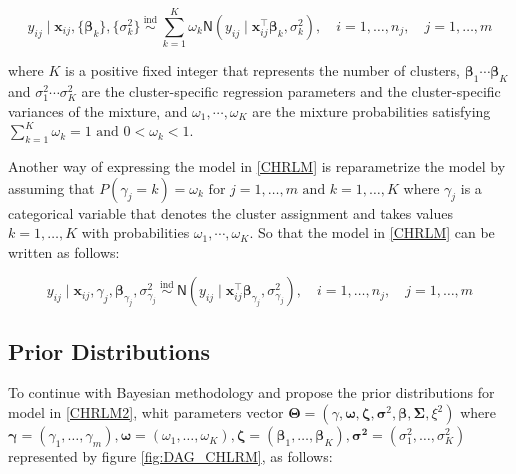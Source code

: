 \begin{equation}
\label{CHRLM}
y_{ij} \mid \bm{x}_{ij}, \lbrace\bm{\beta}_k\rbrace, \lbrace\sigma_k^2 \rbrace \stackrel{\text { ind }}{\sim} \sum_{k=1}^{K}\omega_k\mathsf{N}\left(y_{ij}\mid\bm{x}_{ij}^{\bm{\top}} \bm{\beta}_k, \sigma_k^2\right), \quad i=1, \ldots, n_j, \quad j=1, \ldots, m
\end{equation}

where $K$ is a positive fixed integer that represents the number of clusters, $\bm{\beta}_1\cdots\bm{\beta}_K$ and $\sigma^2_1\cdots\sigma^2_K$ are the cluster-specific regression parameters and the cluster-specific variances of the mixture, and $\omega_1,\cdots,\omega_K$ are the mixture probabilities satisfying $\sum_{k=1}^{K}\omega_k=1\text{ and }0<\omega_k<1$.

\vspace{0.5cm}

Another way of expressing the model in \ref{CHRLM} is reparametrize the model by assuming that $P(\gamma_j=k)=\omega_k\text{ for   }j=1, \ldots, m\text{ and }k=1, \ldots, K$ where $\gamma_j$ is a categorical variable that denotes the cluster assignment and takes values $k=1, \ldots, K$ with probabilities $\omega_1,\cdots,\omega_K$. So that the model in \ref{CHRLM} can be written as follows:

\begin{equation}
\label{CHRLM2}
y_{ij} \mid \bm{x}_{ij}, \gamma_j,\bm{\beta}_{\gamma_j},\sigma_{\gamma_j}^2\stackrel{\text { ind }}{\sim} \mathsf{N}\left(y_{ij}\mid\bm{x}_{ij}^{\bm{\top}} \bm{\beta}_{\gamma_j}, \sigma_{\gamma_j}^2\right), \quad i=1, \ldots, n_j, \quad j=1, \ldots, m
\end{equation}

\newpage

\subsection{Prior Distributions}

To continue with Bayesian methodology and propose the prior distributions for model in \ref{CHRLM2}, whit parameters vector $\bm{\Theta}=\left(\gamma, \bm{\omega}, \bm{\zeta}, \bm{\sigma}^2, \bm{\beta}, \bm{\Sigma}, \xi^2\right)$ where $\bm{\gamma}=\left(\gamma_1, \ldots, \gamma_m\right), \bm{\omega}=\left(\omega_1, \ldots, \omega_K\right), \bm{\zeta}=\left(\bm{\beta}_1, \ldots, \bm{\beta}_K\right), \bm{\sigma}^{\mathbf{2}}=\left(\sigma_1^2, \ldots, \sigma_K^2\right)$ represented by figure \ref{fig:DAG_CHLRM}, as follows:

